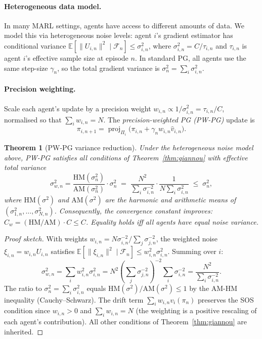 \documentclass[10pt,letterpaper]{article}
\newtheorem{theorem}{Theorem}
\newcommand{\E}{\mathbb{E}}
\newcommand{\calF}{\mathcal{F}}
\newcommand{\norm}[1]{\| #1 \|}
\newcommand{\HM}{\mathrm{HM}}
\newcommand{\AM}{\mathrm{AM}}
\newcommand{\proj}{\operatorname{proj}}
\begin{document}
\paragraph{Heterogeneous data model.}
In many MARL settings, agents have access to different amounts of data.
We model this via heterogeneous noise levels: agent $i$'s gradient
estimator has conditional variance
$\E[\norm{U_{i,n}}^2 \mid \calF_n] \leq \sigma_{i,n}^2$,
where $\sigma_{i,n}^2 = C/\tau_{i,n}$ and $\tau_{i,n}$ is agent $i$'s
effective sample size at episode $n$.
In standard PG, all agents use the same step-size $\gamma_n$,
so the total gradient variance is $\sigma_n^2 = \sum_i \sigma_{i,n}^2$.

\paragraph{Precision weighting.}
Scale each agent's update by a precision weight
$w_{i,n} \propto 1/\sigma_{i,n}^2 = \tau_{i,n}/C$, normalised so
that $\sum_i w_{i,n} = N$. The \emph{precision-weighted PG (PW-PG)}
update is
\begin{equation}
  \label{eq:pw-pg}
  \pi_{i,n+1} = \proj_{\Pi_i}\!\bigl(\pi_{i,n} + \gamma_n w_{i,n} \hat{v}_{i,n}\bigr).
\end{equation}

\begin{theorem}[PW-PG variance reduction]
\label{thm:pwpg}
Under the heterogeneous noise model above, PW-PG satisfies all
conditions of Theorem~\ref{thm:giannou} with effective total variance
\begin{equation}
  \label{eq:hm-am}
  \sigma_{w,n}^2 = \frac{\HM(\sigma_n^2)}{\AM(\sigma_n^2)}\cdot\sigma_n^2
  \;=\; \frac{N^2}{\sum_i \sigma_{i,n}^{-2}} \cdot \frac{1}{N\sum_i \sigma_{i,n}^2}
  \;\leq\; \sigma_n^2,
\end{equation}
where $\HM(\sigma^2)$ and $\AM(\sigma^2)$ are the harmonic and
arithmetic means of $(\sigma_{1,n}^2, \ldots, \sigma_{N,n}^2)$.
Consequently, the convergence constant improves:
$C_w = (\HM/\AM) \cdot C \leq C$.
Equality holds iff all agents have equal noise variance.
\end{theorem}

\begin{proof}[Proof sketch]
With weights $w_{i,n} = N\sigma_{i,n}^{-2}/\sum_j \sigma_{j,n}^{-2}$,
the weighted noise $\xi_{i,n} = w_{i,n} U_{i,n}$ satisfies
$\E[\norm{\xi_{i,n}}^2 \mid \calF_n] \leq w_{i,n}^2 \sigma_{i,n}^2$.
Summing over $i$:
\[
  \sigma_{w,n}^2 = \sum_i w_{i,n}^2 \sigma_{i,n}^2
  = N^2 \left(\sum_j \sigma_{j,n}^{-2}\right)^{-2}\!\! \sum_i \sigma_{i,n}^{-2}
  = \frac{N^2}{\sum_i \sigma_{i,n}^{-2}}.
\]
The ratio to $\sigma_n^2 = \sum_i \sigma_{i,n}^2$ equals
$\HM(\sigma^2)/\AM(\sigma^2) \leq 1$ by the AM-HM inequality
(Cauchy--Schwarz). The drift term $\sum_i w_{i,n} v_i(\pi_n)$
preserves the SOS condition since $w_{i,n} > 0$ and $\sum_i w_{i,n} = N$
(the weighting is a positive rescaling of each agent's contribution).
All other conditions of Theorem~\ref{thm:giannou} are inherited.
\end{proof}
\end{document}
